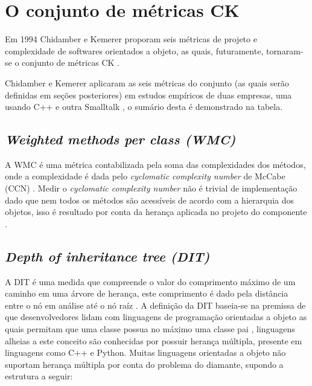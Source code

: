 \documentclass[
	12pt,				%
	oneside,			%
	a4paper,			%
	english,			%
	brazil				%
	]{abntex2ppgsi}
\begin{document}
\section{O conjunto de métricas CK}

Em 1994 Chidamber e Kemerer proporam seis métricas de projeto e complexidade de softwares orientados a objeto, as quais, futuramente, tornaram-se o conjunto de métricas CK \cite{kan95}. 

Chidamber e Kemerer aplicaram as seis métricas do conjunto (as quais serão definidas em seções posteriores) em estudos empíricos de duas empresas, uma usando C++ e outra Smalltalk \cite{kan95}, o sumário desta é demonstrado na tabela.

\subsection{\textit{Weighted methods per class (WMC)}}
A WMC é uma métrica contabilizada pela soma das complexidades dos métodos, onde a complexidade é dada pelo \textit{cyclomatic complexity number}  de McCabe (CCN)\cite{kan95} \cite{watson96}. Medir o \textit{cyclomatic complexity number} não é trivial de implementação dado que nem todos os métodos são acessíveis de acordo com a hierarquia dos objetos, isso é resultado por conta da herança aplicada no projeto do componente \cite{kan95}.

\subsection{\textit{Depth of inheritance tree (DIT)}}
A DIT é uma medida que compreende o valor do comprimento máximo de um caminho em uma árvore de herança, este comprimento é dado pela distância entre o nó em análise até o nó raíz \cite{kan95}. A definição da DIT baseia-se na premissa de que desenvolvedores lidam com linguagens de programação orientadas a objeto as quais permitam que uma classe possua no máximo uma classe pai \cite{bruntink04}, linguagens alheias a este conceito são conhecidas por possuir herança múltipla, presente em linguagens como C++ e Python. Muitas linguagens orientadas a objeto não suportam herança múltipla por conta do problema do diamante, supondo a estrutura a seguir:
\end{document}
